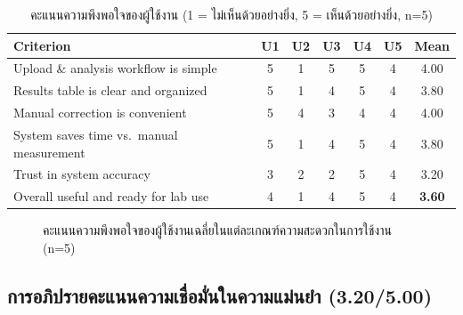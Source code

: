 \begin{table}[H]
  \centering
  \caption{คะแนนความพึงพอใจของผู้ใช้งาน (1 = ไม่เห็นด้วยอย่างยิ่ง, 5 = เห็นด้วยอย่างยิ่ง, n=5)}
  \label{tab:usability}
  \begin{tabular}{lcccccc}
    \toprule
    \textbf{Criterion} & \textbf{U1} & \textbf{U2} & \textbf{U3} & \textbf{U4} & \textbf{U5} & \textbf{Mean} \\
    \midrule
    Upload \& analysis workflow is simple     & 5 & 1 & 5 & 5 & 4 & 4.00 \\
    Results table is clear and organized      & 5 & 1 & 4 & 5 & 4 & 3.80 \\
    Manual correction is convenient           & 5 & 4 & 3 & 4 & 4 & 4.00 \\
    System saves time vs.\ manual measurement & 5 & 1 & 4 & 5 & 4 & 3.80 \\
    Trust in system accuracy                  & 3 & 2 & 2 & 5 & 4 & 3.20 \\
    Overall useful and ready for lab use      & 4 & 1 & 4 & 5 & 4 & \textbf{3.60} \\
    \bottomrule
  \end{tabular}
\end{table}

\begin{figure}[H]
  \centering
  \caption{คะแนนความพึงพอใจของผู้ใช้งานเฉลี่ยในแต่ละเกณฑ์ความสะดวกในการใช้งาน (n=5)}
  \label{fig:usability_bar}
\end{figure}

\subsection{การอภิปรายคะแนนความเชื่อมั่นในความแม่นยำ (3.20/5.00)}

